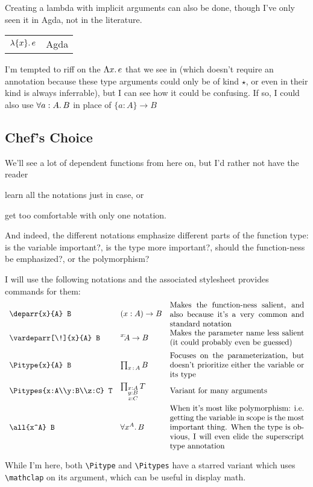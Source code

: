 \documentclass[11pt]{article} %
\makeatletter
\newcommand\ltextcell[1]{\begin{array}[c]{@{}l@{}}\textstyle {#1}\end{array}}
\theoremstyle{definition}
\theoremstyle{remark}
\makeatother
\begin{document}
Creating a lambda with implicit arguments can also be done, though I've only seen it in Agda, not in the literature.
\begin{center}
\renewcommand{\arraystretch}{1.2}
\begin{tabular}{lp{8.2cm}}
${\lambda}{\{x\}}.\,e$ & Agda \\
\end{tabular}
\end{center}
I'm tempted to riff on the ${\Lambda}{x}.\,e$ that we see in \SystemF{} (which doesn't require an annotation because these type arguments could only be of kind $\star$, or even in \SystemFw{} their kind is always inferrable), but I can see how it could be confusing.
If so, I could also use ${\forall}{a:A}.\,B$ in place of $\{a : A\} \to B$

\subsection{Chef's Choice}

We'll see a lot of dependent functions from here on, but I'd rather not have the reader
  \begin{enumerate*}[label=\textit{\roman*})]
  \item learn all the notations just in case, or
  \item get too comfortable with only one notation.
  \end{enumerate*}
And indeed, the different notations emphasize different parts of the function type: is the variable important?, is the type more important?, should the function-ness be emphasized?, or the polymorphism?

I will use the following notations and the associated stylesheet provides commands for them:
\[\begin{array}{llp{6cm}}
  \verb|\deparr{x}{A} B| & \ltextcell{\deparr{x}{A} B} &
    \parbox{6cm}{Makes the function-ness salient, and also because it's a very common and standard notation} \\
  \verb|\vardeparr[\!]{x}{A} B| & \ltextcell{\vardeparr[\!]{x}{A} B} &
    \parbox{6cm}{Makes the parameter name less salient (it could probably even be guessed)} \\
  \verb|\Pitype{x}{A} B| & \ltextcell{\Pitype{x}{A} B} &
    \parbox{6cm}{Focuses on the parameterization, but doesn't prioritize either the variable or its type} \\
  \verb|\Pitypes{x:A\\y:B\\z:C} T| & \ltextcell{\Pitypes{x:A\\y:B\\z:C} T} &
    \parbox{6cm}{Variant for many arguments} \\
  \verb|\all{x^A} B| & \ltextcell{\all{x^A} B} &
    \parbox{6cm}{When it's most like polymorphism: i.e.\ getting the variable in scope is the most important thing.
    When the type is obvious, I will even elide the superscript type annotation} \\
\end{array}\]
While I'm here, both \verb!\Pitype! and \verb!\Pitypes! have a starred variant which uses \verb!\mathclap! on its argument, which can be useful in display math.
\end{document}

